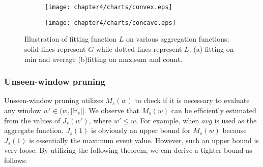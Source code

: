 \begin{figure}
	\centering
    \begin{subfigure}[b]{0.45\textwidth}
        \texttt{[image: chapter4/charts/convex.eps]}
        \caption{}
    \end{subfigure}
    \begin{subfigure}[b]{0.45\textwidth}
        \texttt{[image: chapter4/charts/concave.eps]}
        \caption{}
    \end{subfigure}
    \caption{Illustration of fitting function $L$ on various aggregation functions; solid lines represent $G$ while dotted lines represent $L$. (a) fitting on min and average (b)fitting on max,sum and count.}
    \label{fig:convex_exp}
\end{figure}


\subsubsection{Unseen-window pruning}
\label{sec:useen-window-bound}
Unseen-window pruning utilizes $M_s(w)$ to check if it is necessary to evaluate any 
window $w' \in (w,|\mathbb{H}_s|]$. We observe that $M_s(w)$ can
be efficiently estimated from the values of $J_s(w')$, where $w'\leq w$. 
For example, when $avg$ is used as the aggregate function, $J_s(1)$ is obviously an upper bound for $M_s(w)$ because $J_s(1)$ is essentially the maximum event value. However, such an upper bound is very loose. By utilizing the following theorem, we can derive a tighter bound as follows:

